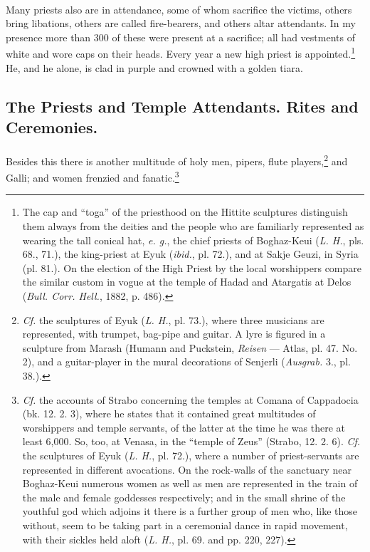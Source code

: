 \documentclass[a4paper, 11pt, oneside, polutonikogreek, english]{article}
\begin{document}
\paragraph{}
Many priests also are in attendance, some of whom sacrifice the victims, others bring libations, others are called fire-bearers, and others altar attendants. In my presence more than 300 of these were present at a sacrifice; all had vestments of white and wore caps on their heads. Every year a new high priest is appointed.\footnote{The cap and ``toga'' of the priesthood on the Hittite sculptures distinguish them always from the deities and the people who are familiarly represented as wearing the tall conical hat, \emph{e. g.}, the chief priests of Boghaz-Keui (\emph{L. H.}, pls. 68., 71.), the king-priest at Eyuk (\emph{ibid.}, pl. 72.), and at Sakje Geuzi, in Syria (pl. 81.). On the election of the High Priest by the local worshippers compare the similar custom in vogue at the temple of Hadad and Atargatis at Delos (\emph{Bull. Corr. Hell.}, 1882, p. 486).} He, and he alone, is clad in purple and crowned with a golden tiara.

\subsection{The Priests and Temple Attendants. Rites and Ceremonies.}
\paragraph{}
Besides this there is another multitude of holy men, pipers, flute players,\footnote{\emph{Cf.} the sculptures of Eyuk (\emph{L. H.}, pl. 73.), where three musicians are represented, with trumpet, bag-pipe and guitar. A lyre is figured in a sculpture from Marash (Humann and Puckstein, \emph{Reisen} --- Atlas, pl. 47. No. 2), and a guitar-player in the mural decorations of Senjerli (\emph{Ausgrab.} 3., pl. 38.).} and Galli; and women frenzied and fanatic.\footnote{\emph{Cf.} the accounts of Strabo concerning the temples at Comana of Cappadocia (bk. 12. 2. 3), where he states that it contained great multitudes of worshippers and temple servants, of the latter at the time he was there at least 6,000. So, too, at Venasa, in the ``temple of Zeus'' (Strabo, 12. 2. 6). \emph{Cf.} the sculptures of Eyuk (\emph{L. H.}, pl. 72.), where a number of priest-servants are represented in different avocations. On the rock-walls of the sanctuary near Boghaz-Keui numerous women as well as men are represented in the train of the male and female goddesses respectively; and in the small shrine of the youthful god which adjoins it there is a further group of men who, like those without, seem to be taking part in a ceremonial dance in rapid movement, with their sickles held aloft (\emph{L. H.}, pl. 69. and pp. 220, 227).}
\end{document}
